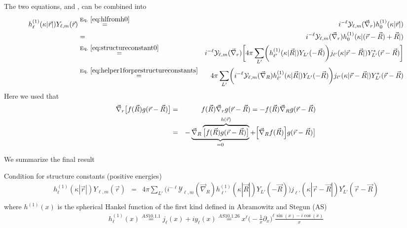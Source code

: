 \documentclass[11pt,a4paper]{report}
\begin{document}
The two equations,  and ,
can be combined into
\begin{eqnarray*}
h_\ell^{(1)}(\kappa |\vec{r}|)Y_{\ell,m}(\vec{r})
&\eqrel{eq:hlfromh0}{=}&
i^{-\ell}\mathcal{Y}_{\ell,m}(\vec{\nabla}_r)h_0^{(1)}(\kappa |\vec{r}|)
\\
&=&
i^{-\ell}\mathcal{Y}_{\ell,m}(\vec{\nabla}_r)
h_0^{(1)}(\kappa |(\vec{r}-\vec{R})+\vec{R}|)
\\
&\eqrel{eq:structureconstant0}{=}&
i^{-\ell}\mathcal{Y}_{\ell,m}(\vec{\nabla}_r)
\biggl[
4\pi\sum_{L'}\biggl( h^{(1)}_{\ell'}(\kappa|\vec{R}|)Y_{L'}(-\vec{R})\biggr)
j_{\ell'}(\kappa|\vec{r}-\vec{R}|)Y_{L'}^*(\vec{r}-\vec{R})
\biggr]
\\
&\eqrel{eq:helper1forprestructureconstants}{=}&
4\pi\sum_{L'}\biggl(i^{-\ell}
\mathcal{Y}_{\ell,m}(\vec{\nabla}_R) 
h^{(1)}_{\ell'}(\kappa|\vec{R}|)Y_{L'}(-\vec{R})\biggr)
j_{\ell'}(\kappa|\vec{r}-\vec{R}|)Y_{L'}^*(\vec{r}-\vec{R})
\end{eqnarray*}
Here we used that 
\begin{eqnarray}
\vec{\nabla}_r \bigl[f(\vec{R})g(\vec{r}-\vec{R})\bigr]
&=&f(\vec{R})\vec{\nabla}_rg(\vec{r}-\vec{R})
=-f(\vec{R})\vec{\nabla}_Rg(\vec{r}-\vec{R})
\\
&=&-\underbrace{\vec{\nabla}_R\overbrace{\bigl[f(\vec{R})g(\vec{r}-\vec{R})\bigr]
}^{h(\vec{r})}}_{=0}
+\Bigl[\vec{\nabla}_Rf(\vec{R})\Bigr]g(\vec{r}-\vec{R})\bigr]
\label{eq:helper1forprestructureconstants}
\end{eqnarray}

We summarize the final result
\begin{myshadowminipage}{Condition for structure constants (positive energies)}
\begin{eqnarray}
h_\ell^{(1)}(\kappa |\vec{r}|)Y_{\ell,m}(\vec{r})
&=&
4\pi\sum_{L'}\biggl(i^{-\ell}
\mathcal{Y}_{\ell,m}(\vec{\nabla}_R) 
h^{(1)}_{\ell'}(\kappa|\vec{R}|)Y_{L'}(-\vec{R})\biggr)
j_{\ell'}(\kappa|\vec{r}-\vec{R}|)Y_{L'}^*(\vec{r}-\vec{R})
\nonumber\\
\label{eq:prestructureconstants}
\end{eqnarray}
where $h^{(1)}(x)$ is the spherical Hankel function of the first kind
defined in Abramowitz and Stegun (AS)\cite{abramowitz}
\begin{eqnarray}
h_\ell^{(1)}(x)\stackrel{AS 10.1.1}{=}j_\ell(x)+iy_\ell(x)
\stackrel{AS10.1.26}{=}
x^\ell\biggl(-\frac{1}{x}\partial_x\biggr)^\ell\frac{\sin(x)-i\cos(x)}{x}
\label{eq:defsphericalhankelfirstkind}
\end{eqnarray}
\end{myshadowminipage}
\end{document}
